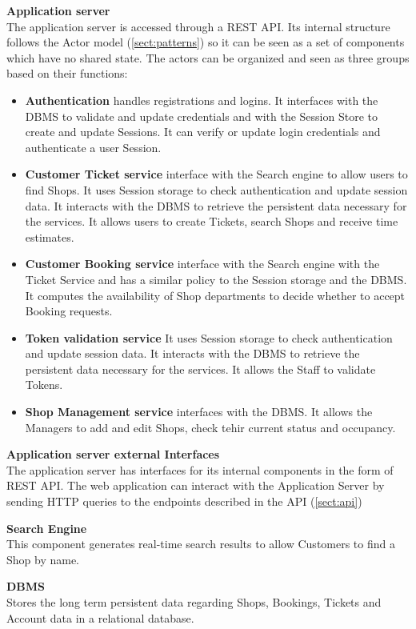 \textbf{Application server}\\
The application server is accessed through a REST API. Its internal structure follows the Actor model (\ref{sect:patterns}) so it can be seen as a set of components which have no shared state. The actors can be organized and seen as three groups based on their functions:
\begin{itemize}
    \item \textbf{Authentication} handles registrations and logins. It interfaces with the DBMS to validate and update credentials and with the Session Store to create and update Sessions. It can verify or update login credentials and authenticate a user Session.
    \item \textbf{Customer Ticket service} interface with the Search engine to allow users to find Shops. It uses Session storage to check authentication and update session data. It interacts with the DBMS to retrieve the persistent data necessary for the services. It allows users to create Tickets, search Shops and receive time estimates.
    \item \textbf{Customer Booking service} interface with the Search engine with the Ticket Service and has a similar policy to the Session storage and the DBMS. It computes the availability of Shop departments to decide whether to accept Booking requests.
    \item \textbf{Token validation service} It uses Session storage to check authentication and update session data. It interacts with the DBMS to retrieve the persistent data necessary for the services. It allows the Staff to validate Tokens. 
    \item \textbf{Shop Management service} interfaces with the DBMS. It allows the Managers to add and edit Shops, check tehir current status and occupancy.

\end{itemize}
\textbf{Application server external Interfaces}\\
The application server has interfaces for its internal components in the form of REST API. The web application can interact with the Application Server by sending HTTP queries to the endpoints described in the API (\ref{sect:api})

\textbf{Search Engine}\\ This component generates real-time search results to allow Customers to find a Shop by name.

\textbf{DBMS}\\ Stores the long term persistent data regarding Shops, Bookings, Tickets and Account data in a relational database.

